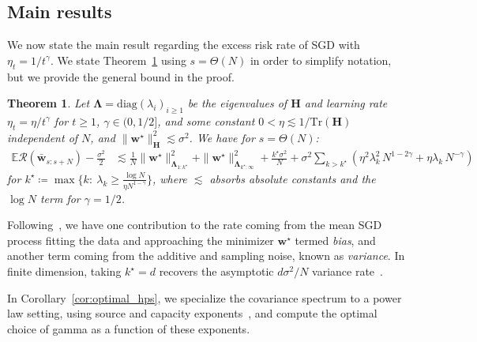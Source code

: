 \documentclass{article}
\newtheorem{theorem}{Theorem}
\def\bw{\bar{\mathbf{w}}}
\def\w{{\mathbf{w}}}
\def\H{{\mathbf{H}}}
\def\H{{\mathbf{H}}}
\def\risk{\mathcal{R}}
\def\diag{\text{diag}}
\def\LLambda{{\mathbf{\Lambda}}}
\def\tr{\text{Tr}}
\newcommand{\E}{\mathbb{E}}
\def\bw{\bar{\mathbf{w}}}
\def\w{{\mathbf{w}}}
\def\H{{\mathbf{H}}}
\def\H{{\mathbf{H}}}
\def\risk{\mathcal{R}}
\def\LLambda{{\mathbf{\Lambda}}}
\def\tr{\text{Tr}}
\theoremstyle{plain}
\def\bw{\bar{\mathbf{w}}}
\def\w{{\mathbf{w}}}
\def\H{{\mathbf{H}}}
\def\diag{{\text{diag}}}
\def\risk{\mathcal{R}}
\def\E{\mathbb{E}}
\def\LLambda{{\mathbf{\Lambda}}}
\begin{document}
\subsection{Main results}
We now state the main result regarding the excess risk rate of SGD with $\eta_t = 1/t^\gamma$. We state Theorem~\ref{thm:tgamma_rate} using $s=\Theta(N)$ in order to simplify notation, but we provide the general bound in the proof.
\begin{theorem}
    \label{thm:tgamma_rate}
    Let $\LLambda = \diag(\lambda_i)_{i\geq 1}$ be the eigenvalues of $\H$ and learning rate $\eta_t = \eta/t^\gamma$ for $t \geq 1$, $\gamma \in (0, 1/2]$, and some constant $0 < \eta \lesssim 1/\tr(\H)$ independent of $N$, and $\|\w^\star\|_\H^2 \lesssim \sigma^2$. We have for $s = \Theta(N)$:
    \begin{align*}
        \E \risk(\bw_{s:s+N}) - \frac{\sigma^2}{2} &\lesssim \frac{1}{N} \|\w^\star\|_{\LLambda_{1:k^\star}}^2 + \|\w^\star\|_{\LLambda_{k^\star:\infty}}^2 + \frac{k^\star \sigma^2}{N}
     + \sigma^2
    \sum_{k>k^\star}
    \left(
        \eta^2 \lambda_k^2\, N^{1-2\gamma}
    + \eta \lambda_k\, N^{-\gamma}
    \right)
    \end{align*}
    for $k^\star
\coloneqq
\max\Big\{k:\ \lambda_k \ge \tfrac{\log N}{\eta N^{1-\gamma}}\Big\}$, where $\lesssim$ absorbs absolute constants and the $\log N$ term for $\gamma = 1/2$.
\end{theorem}
Following~\citet{jain2017markov}, we have one contribution to the rate coming from the mean SGD process fitting the data and approaching the minimizer $\w^\star$ termed \textit{bias}, and another term coming from the additive and sampling noise, known as \textit{variance}. In finite dimension, taking $k^\star = d$ recovers the asymptotic $d \sigma^2/N$ variance rate~\citep{polyak1992acceleration,bach2013non,ge2019step}. 

In Corollary~\ref{cor:optimal_hps}, we specialize the covariance spectrum to a power law setting, using source and capacity exponents~\citep{caponnetto2007optimal,lin2024scaling,bordelon2024dynamical,paquette20244+}, and compute the optimal choice of gamma as a function of these exponents.
\end{document}
